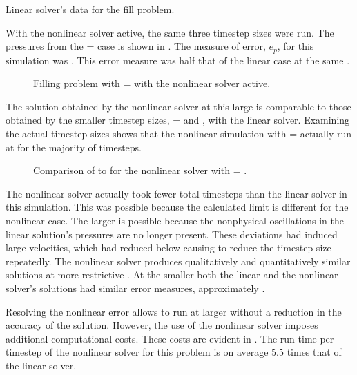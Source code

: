 \begin{table}[h!tb]
\centering
\singlespace

\caption{Linear solver's data for the fill problem.}
\label{tab:vmpLinRunTime}
\end{table}

With the nonlinear solver active, the same three timestep sizes were run.
The pressures from the \dtmax{} =  case is shown in .
The measure of error, $e_{p}$, for this simulation was .
This error measure was half that of the linear case at the same \dtmax{}.

\begin{figure}[h!tb]
\centering

\caption{Filling problem with \dtmax{} =  with the nonlinear solver active.}
\label{fig:nlnFill1em1}
\end{figure}

The solution obtained by the nonlinear solver at this large \dtmax{} is comparable to those obtained by the smaller timestep sizes, \dtmax{} =  and , with the linear solver.
Examining the actual timestep sizes shows that the nonlinear simulation with \dtmax{} =  actually run at \dtmax{} for the majority of timesteps.

\begin{figure}[h!tb]
\centering

\caption{Comparison of \dt{} to \dtcrnt{} for the nonlinear solver with \dtmax{} = .}
\label{fig:vmpDeltaTNln1em1}
\end{figure}

The nonlinear solver actually took fewer total timesteps than the linear solver in this simulation.
This was possible because the calculated \dtcrnt{} limit is different for the nonlinear case.
The larger \dtcrnt{} is possible because the nonphysical oscillations in the linear solution's pressures are no longer present.
These deviations had induced large velocities, which had reduced \dtcrnt{} below \dtmax{} causing \cobra{} to reduce the timestep size repeatedly.
The nonlinear solver produces qualitatively and quantitatively similar solutions at more restrictive \dtmax{}.
At the smaller \dtmax{} both the linear and the nonlinear solver's solutions had similar error measures, approximately .

Resolving the nonlinear error allows \cobra{} to run at larger \dt{} without a reduction in the accuracy of the solution.
However, the use of the nonlinear solver imposes additional computational costs.
These costs are evident in .
The run time per timestep of the nonlinear solver for this problem is on average 5.5 times that of the linear solver.

